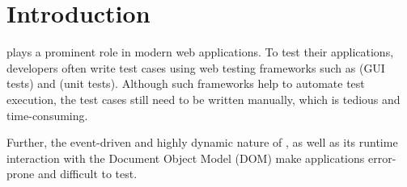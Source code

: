 \section{Introduction} \label{Sec:intro}
\javascript plays a prominent role in modern web applications. To test their \javascript applications,  developers often write test cases using web testing frameworks such as \selenium (GUI tests) and \qunit (\javascript unit tests). Although such frameworks help to automate test execution, the test cases still need to be written manually, which is tedious and time-consuming. 
 
Further, the event-driven and highly dynamic nature of \javascript, as well as its runtime interaction with the Document Object Model (DOM) make \javascript applications error-prone \cite{Ocariza:esem2013} and difficult to test. %
%
%
%

